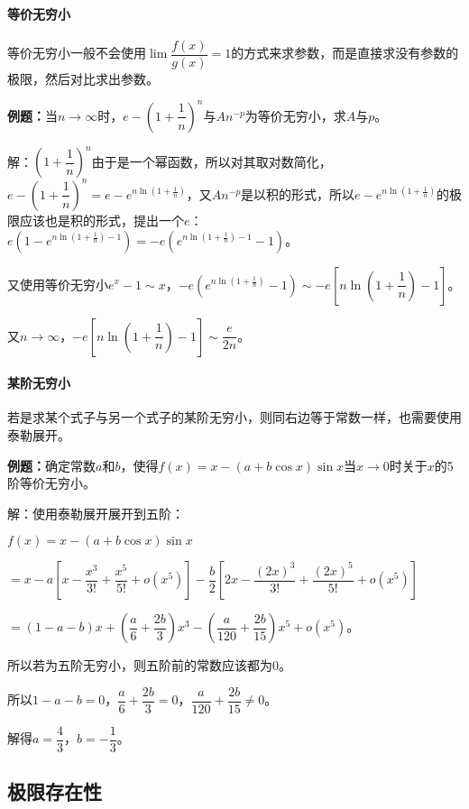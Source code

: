 \documentclass[UTF8, 12pt]{ctexart}
\begin{document}
\paragraph{等价无穷小} \leavevmode \medskip

等价无穷小一般不会使用$\lim\dfrac{f(x)}{g(x)}=1$的方式来求参数，而是直接求没有参数的极限，然后对比求出参数。

\textbf{例题：}当$n\to\infty$时，$e-\left(1+\dfrac{1}{n}\right)^n$与$An^{-p}$为等价无穷小，求$A$与$p$。

解：$\left(1+\dfrac{1}{n}\right)^n$由于是一个幂函数，所以对其取对数简化，$e-\left(1+\dfrac{1}{n}\right)^n=e-e^{n\ln(1+\frac{1}{n})}$，又$An^{-p}$是以积的形式，所以$e-e^{n\ln(1+\frac{1}{n})}$的极限应该也是积的形式，提出一个$e$：$e(1-e^{n\ln(1+\frac{1}{n})-1})=-e(e^{n\ln(1+\frac{1}{n})-1}-1)$。

又使用等价无穷小$e^x-1\sim x$，$-e(e^{n\ln(1+\frac{1}{n})}-1)\sim-e\left[n\ln\left(1+\dfrac{1}{n}\right)-1\right]$。

又$n\to\infty$，$-e\left[n\ln\left(1+\dfrac{1}{n}\right)-1\right]\sim\dfrac{e}{2n}$。

\paragraph{某阶无穷小} \leavevmode \medskip

若是求某个式子与另一个式子的某阶无穷小，则同右边等于常数一样，也需要使用泰勒展开。

\textbf{例题：}确定常数$a$和$b$，使得$f(x)=x-(a+b\cos x)\sin x$当$x\to 0$时关于$x$的5阶等价无穷小。

解：使用泰勒展开展开到五阶：

$f(x)=x-(a+b\cos x)\sin x$

$=x-a\left[x-\dfrac{x^3}{3!}+\dfrac{x^5}{5!}+o(x^5)\right]-\dfrac{b}{2}\left[2x-\dfrac{(2x)^3}{3!}+\dfrac{(2x)^5}{5!}+o(x^5)\right]$

$=(1-a-b)x+\left(\dfrac{a}{6}+\dfrac{2b}{3}\right)x^3-\left(\dfrac{a}{120}+\dfrac{2b}{15}\right)x^5+o(x^5)$。\medskip

所以若为五阶无穷小，则五阶前的常数应该都为0。

所以$1-a-b=0$，$\dfrac{a}{6}+\dfrac{2b}{3}=0$，$\dfrac{a}{120}+\dfrac{2b}{15}\neq0$。

解得$a=\dfrac{4}{3}$，$b=-\dfrac{1}{3}$。

\subsection{极限存在性}
\end{document}
